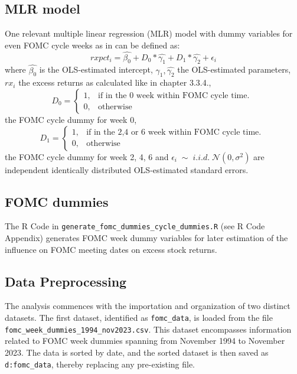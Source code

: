 \subsection{MLR model}

One relevant multiple linear regression (MLR) model with dummy variables for even FOMC cycle weeks as in \parencite{cieslak_stock_2019} can be defined as:
\begin{equation}
	rxpct_{i}=\hat{\beta_{0}}+D_0*\hat{\gamma_{1}}+D_1*\hat{\gamma_{2}}+\epsilon_i
\end{equation}
where
$ { \hat{\beta_{0}} } $ is the OLS-estimated intercept,
$ { \hat{\gamma_{1}}, \hat{\gamma_{2}} } $ the OLS-estimated parameters,
${ rx_{i} } $ the excess returns as calculated like in chapter 3.3.4., 
\begin{equation}
    D_0=
    \begin{cases}
      1, & \text{if in the 0 week within FOMC cycle time. }\\
      0, & \text{otherwise}
    \end{cases}
\end{equation}
the FOMC cycle dummy for week 0, 
\begin{equation}
    D_1=
    \begin{cases}
      1, & \text{if in the 2,4 or 6 week within FOMC cycle time. } \\
      0, & \text{otherwise}
    \end{cases}
\end{equation}
the FOMC cycle dummy for week 2, 4, 6 and
$ { \epsilon_i \; \sim \; i.i.d.  \; \mathcal{N}\left(0, \sigma^2 \right) } $
are independent identically distributed OLS-estimated standard errors. 

\subsection{FOMC dummies}

The R Code in \texttt{generate\_fomc\_dummies\_cycle\_dummies.R} (see R Code Appendix)
generates FOMC week dummy variables for later estimation of the influence on FOMC meeting dates on excess stock returns.

\subsection{Data Preprocessing}

The analysis commences with the importation and organization of two distinct datasets. 
The first dataset, identified as \texttt{fomc\_data}, is loaded from the file \texttt{fomc\_week\_dummies\_1994\_nov2023.csv}. 
This dataset encompasses information related to FOMC week dummies spanning from November 1994 to November 2023. The data is sorted by date, and the sorted dataset is then saved as \texttt{d:fomc\_data}, thereby replacing any pre-existing file.

